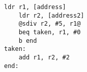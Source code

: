 \begin{lstlisting}[style=AsmStyle]
    ldr r1, [address]
    ldr r2, [address2]
    @sdiv r2, #5, r1@
    beq taken, r1, #0
    b end
taken:
    add r1, r2, #2
end:
\end{lstlisting}